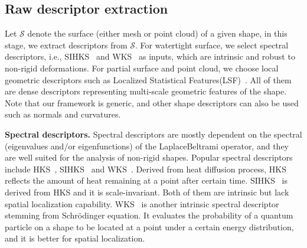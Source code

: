 \documentclass[runningheads]{llncs}
\begin{document}
\subsection{Raw descriptor extraction} 
Let $\mathcal{S}$ denote the surface (either mesh or point cloud) of a given shape, in this stage, we extract descriptors from $\mathcal{S}$.  For watertight surface, we select spectral descriptors, i.e., SIHKS~\cite{MMB1} and WKS~\cite{MathieuWKS} as inputs, which are intrinsic and robust to non-rigid deformations. For partial surface and point cloud, we choose local geometric descriptors such as Localized Statistical Features(LSF)~\cite{Ohkita2012Non}. All of them are dense descriptors representing multi-scale geometric features of the shape. Note that our framework is generic, and other shape descriptors can also be used such as normals and curvatures.

\noindent
\textbf{Spectral descriptors.} 
Spectral descriptors are mostly dependent on the spectral (eigenvalues and/or eigenfunctions) of the Laplace\text{-}Beltrami operator, and they are well suited for the analysis of non-rigid shapes. Popular spectral descriptors include HKS~\cite{Jian}, SIHKS~\cite{MMB1} and WKS~\cite{MathieuWKS}. Derived from heat diffusion process, HKS~\cite{Jian} reflects the amount of heat remaining at a point after certain time. SIHKS~\cite{MMB1} is derived from HKS and it is scale-invariant.  Both of them are intrinsic but lack spatial localization capability. WKS~\cite{MathieuWKS} is another intrinsic spectral descriptor stemming from Schr\"{o}dinger equation. It evaluates the probability of a quantum particle on a shape to be located at a point under a certain energy distribution, and it is better for spatial localization. 
\end{document}

